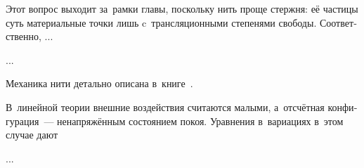 

\begin{otherlanguage}{russian}

Этот вопрос выходит за~рамки главы, поскольку нить проще стержня: её частицы суть  материальные точки лишь c~трансляционными степенями свободы. Соответственно, ...

...


Механика нити детально описана в~книге~\cite{merkin-threadmechanics}.

\end{otherlanguage}



\begin{otherlanguage}{russian}

В~линейной теории внешние воздействия считаются малыми, а~отсчётная конфигурация~--- ненапряжённым состоянием покоя. Уравнения в~вариациях в~этом случае дают

...



\end{otherlanguage}



